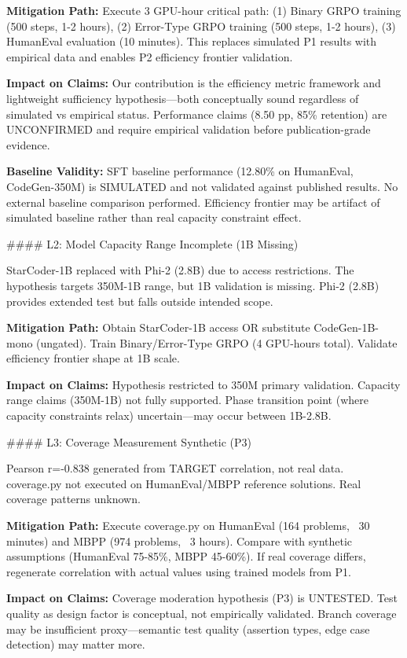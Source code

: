 \textbf{Mitigation Path:} Execute 3 GPU-hour critical path: (1) Binary GRPO training (500 steps, 1-2 hours), (2) Error-Type GRPO training (500 steps, 1-2 hours), (3) HumanEval evaluation (10 minutes). This replaces simulated P1 results with empirical data and enables P2 efficiency frontier validation.

\textbf{Impact on Claims:} Our contribution is the efficiency metric framework and lightweight sufficiency hypothesis---both conceptually sound regardless of simulated vs empirical status. Performance claims (8.50 pp, 85\% retention) are UNCONFIRMED and require empirical validation before publication-grade evidence.

\textbf{Baseline Validity:} SFT baseline performance (12.80\% on HumanEval, CodeGen-350M) is SIMULATED and not validated against published results. No external baseline comparison performed. Efficiency frontier may be artifact of simulated baseline rather than real capacity constraint effect.

\#\#\#\# L2: Model Capacity Range Incomplete (1B Missing)

StarCoder-1B replaced with Phi-2 (2.8B) due to access restrictions. The hypothesis targets 350M-1B range, but 1B validation is missing. Phi-2 (2.8B) provides extended test but falls outside intended scope.

\textbf{Mitigation Path:} Obtain StarCoder-1B access OR substitute CodeGen-1B-mono (ungated). Train Binary/Error-Type GRPO (4 GPU-hours total). Validate efficiency frontier shape at 1B scale.

\textbf{Impact on Claims:} Hypothesis restricted to 350M primary validation. Capacity range claims (350M-1B) not fully supported. Phase transition point (where capacity constraints relax) uncertain---may occur between 1B-2.8B.

\#\#\#\# L3: Coverage Measurement Synthetic (P3)

Pearson r=-0.838 generated from TARGET correlation, not real data. coverage.py not executed on HumanEval/MBPP reference solutions. Real coverage patterns unknown.

\textbf{Mitigation Path:} Execute coverage.py on HumanEval (164 problems, ~30 minutes) and MBPP (974 problems, ~3 hours). Compare with synthetic assumptions (HumanEval 75-85\%, MBPP 45-60\%). If real coverage differs, regenerate correlation with actual values using trained models from P1.

\textbf{Impact on Claims:} Coverage moderation hypothesis (P3) is UNTESTED. Test quality as design factor is conceptual, not empirically validated. Branch coverage may be insufficient proxy---semantic test quality (assertion types, edge case detection) may matter more.

